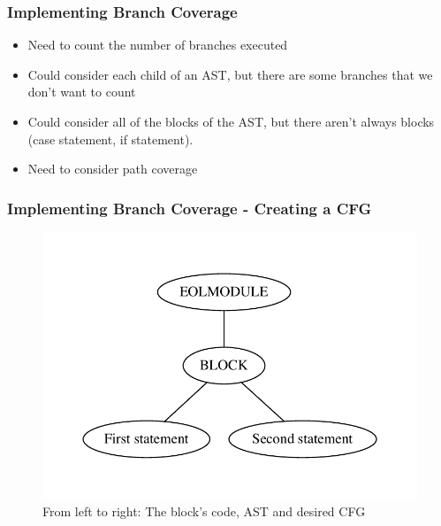 \begin{frame}
\frametitle{Implementing Branch Coverage}

\begin{itemize}
\item Need to count the number of branches executed
\item Could consider each child of an AST, but there are some branches that we don't want to count
\item Could consider all of the blocks of the AST, but there aren't always blocks (case statement, if statement).
\item Need to consider path coverage
\end{itemize}

\end{frame}

\begin{frame}
\frametitle{Implementing Branch Coverage - Creating a CFG}

\begin{figure}
\centering
\begin{minipage}{.3\textwidth}
  \centering
  
\end{minipage}%
\begin{minipage}{.3\textwidth}
  \centering
  \includegraphics[width=\linewidth]{figures/statements/block_AST.pdf}
\end{minipage}
\begin{minipage}{.3\textwidth}
  \centering
\end{minipage}
\caption{From left to right: The block's code, AST and desired CFG}
\label{fig:block}
\end{figure}

\end{frame}

